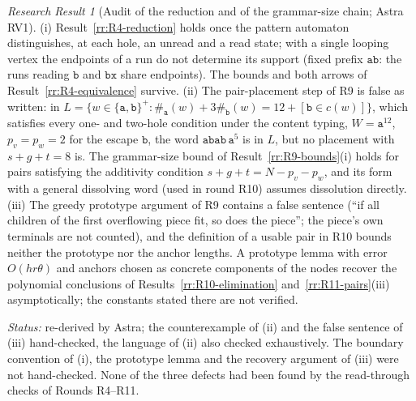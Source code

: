 \documentclass[11pt]{article}
\numberwithin{equation}{section}
\theoremstyle{plain}
\theoremstyle{definition}
\theoremstyle{remark}
\newtheorem{rresult}[theorem]{Research Result}
\theoremstyle{plain}
\begin{document}
\begin{rresult}[Audit of the reduction and of the grammar-size chain; Astra RV1]
\label{rr:RV1-audit}
(i) Result~\ref{rr:R4-reduction} holds once the pattern automaton distinguishes, at each hole, an
unread and a read state; with a single looping vertex the endpoints of a run do not determine its
support (fixed prefix $\mathtt{ab}$: the runs reading $\mathtt b$ and $\mathtt{bx}$ share
endpoints).  The bounds and both arrows of Result~\ref{rr:R4-equivalence} survive.
(ii) The pair-placement step of R9 is false as written: in
$L=\{w\in\{\mathtt a,\mathtt b\}^+:\#_{\mathtt a}(w)+3\#_{\mathtt b}(w)=12+[\mathtt b\in c(w)]\}$,
which satisfies every one- and two-hole condition under the content typing, $W=\mathtt a^{12}$,
$p_v=p_w=2$ for the escape $\mathtt b$, the word $\mathtt{abab}\,\mathtt a^5$ is in $L$, but no
placement with $s+g+t=8$ is.  The grammar-size bound of Result~\ref{rr:R9-bounds}(i) holds for
pairs satisfying the additivity condition $s+g+t=N-p_v-p_w$, and its form with a general
dissolving word (used in round R10) assumes dissolution directly.
(iii) The greedy prototype argument of R9 contains a false sentence (``if all children of the
first overflowing piece fit, so does the piece''; the piece's own terminals are not counted), and
the definition of a usable pair in R10 bounds neither the prototype nor the anchor lengths.  A
prototype lemma with error $O(hr\theta)$ and anchors chosen as concrete components of the nodes
recover the polynomial conclusions of Results~\ref{rr:R10-elimination} and~\ref{rr:R11-pairs}(iii)
asymptotically; the constants stated there are not verified.
\end{rresult}
\noindent\emph{Status:} re-derived by Astra; the counterexample of (ii) and the false sentence
of (iii) hand-checked, the language of (ii) also checked exhaustively.  The boundary convention of
(i), the prototype lemma and the recovery argument of (iii) were not hand-checked.  None of the
three defects had been found by the read-through checks of Rounds R4--R11.
\end{document}
